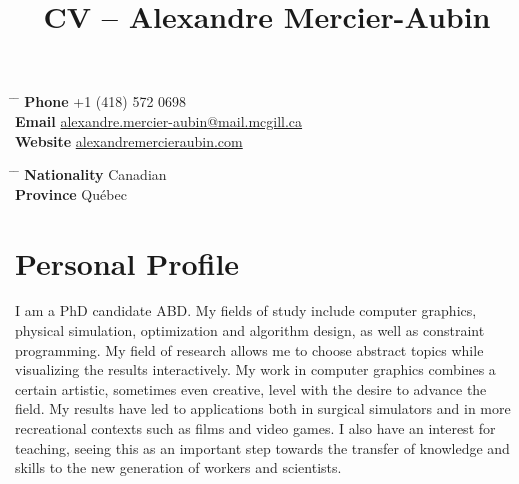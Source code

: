 \documentclass[10pt]{article} %
\begin{document}

\title{CV -- Alexandre Mercier-Aubin} %


\parbox{0.5\textwidth}{ %
\begin{tabbing} %
\hspace{3cm} \= \hspace{4cm} \= \kill %
{\bf Phone} \> +1 (418) 572 0698 \\ %
{\bf Email} \> \href{mailto:alexandre.mercier-aubin@mail.mcgill.ca}{alexandre.mercier-aubin@mail.mcgill.ca} \\ %
{\bf Website} \> \href{https://alexandremercieraubin.com}{alexandremercieraubin.com} \\
\end{tabbing}}
\hfill %
\parbox{0.5\textwidth}{ %
\begin{tabbing} %
\hspace{3cm} \= \hspace{4cm} \= \kill %
{\bf Nationality} \> Canadian \\ %
{\bf Province} \> {Québec}\\
\end{tabbing}}

\vspace{-0.7cm} 

\justifying


\section{Personal Profile}

I am a PhD candidate ABD. My fields of study include computer graphics, physical simulation, optimization and algorithm design, as well as constraint programming. My field of research allows me to choose abstract topics while visualizing the results interactively. My work in computer graphics combines a certain artistic, sometimes even creative, level with the desire to advance the field. My results have led to applications both in surgical simulators and in more recreational contexts such as films and video games. I also have an interest for teaching, seeing this as an important step towards the  transfer of knowledge and skills to the new generation of workers and scientists.
\end{document}
